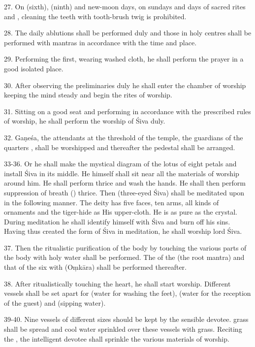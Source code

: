 27. On  (sixth),  (ninth) and new-moon days, on sundays and
days of sacred rites and , cleaning the teeth with tooth-brush twig
is prohibited.

28. The daily ablutions shall be performed duly and those in holy centres shall
be performed with mantras in accordance with the time and place.

29. Performing the  first, wearing washed cloth, he shall perform
the  prayer in a good isolated place.

30. After observing the preliminaries duly he shall enter the chamber of worship
keeping the mind steady and begin the rites of worship.

31. Sitting on a good seat and performing  \etc in accordance with
the prescribed rules of worship, he shall perform the worship of Śiva duly.

32. Gaṇeśa, the attendants at the threshold of the temple, the guardians of
the quarters \etc, shall be worshipped and thereafter the pedestal shall be
arranged.

33-36. Or he shall make the mystical diagram of the lotus of eight petals and
install Śiva in its middle. He himself shall sit near all the materials of
worship around him. He shall perform  thrice and wash the hands. He
shall then perform suppression of breath () thrice. Then
 (three-eyed Śiva) shall be meditated upon in the following manner.
The deity has five faces, ten arms, all kinds of ornaments and the tiger-hide as
His upper-cloth. He is as pure as the crystal. During meditation he shall
identify himself with Śiva and burn off his sins. Having thus created the form
of Śiva in meditation, he shall worship lord Śiva.

37. Then the ritualistic purification of the body by touching the various parts
of the body with holy water shall be performed. The  of
the  (the root mantra) and that of the six  with
 (Oṃkāra) shall be performed thereafter.

38. After ritualistically touching the heart, he shall start worship. Different
vessels shall be set apart for  (water for washing the feet),
 (water for the reception of the guest) and  (sipping
water).

39-40. Nine vessels of different sizes should be kept by the sensible devotee.
 grass shall be spread and cool water sprinkled over these vessels
with  grass. Reciting the , the intelligent devotee shall
sprinkle the various materials of worship.

